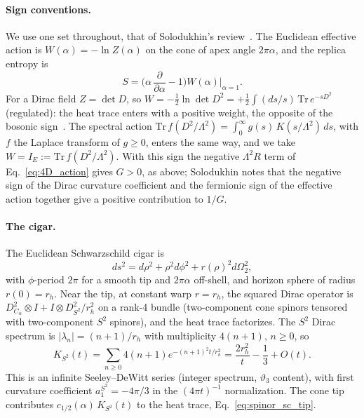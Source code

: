 \documentclass[11pt,a4paper]{article}
\theoremstyle{plain}
\theoremstyle{definition}
\renewcommand{\_}{\textunderscore\allowbreak}
\begin{document}
\paragraph{Sign conventions.} We use one set throughout, that of
Solodukhin's review~\cite{solodukhin2011_review}. The Euclidean effective
action is $W(\alpha) = -\ln Z(\alpha)$ on the cone of apex angle
$2\pi\alpha$, and the replica entropy is
\begin{equation}
  S = \Big(\alpha\,\frac{\partial}{\partial\alpha} - 1\Big)
      W(\alpha)\Big|_{\alpha = 1}.
  \label{eq:replica_formula}
\end{equation}
For a Dirac field $Z = \det D$, so
$W = -\tfrac12\ln\det D^2 = +\tfrac12\int (ds/s)\,\mathrm{Tr}\,e^{-sD^2}$
(regulated): the heat trace enters with a positive weight, the opposite of
the bosonic sign~\cite{kabat1995, solodukhin2011_review}. The spectral
action $\mathrm{Tr}\, f(D^2/\Lambda^2) = \int_0^\infty g(s)\,
K(s/\Lambda^2)\, ds$, with $f$ the Laplace transform of $g \ge 0$, enters
the same way, and we take $W = I_E := \mathrm{Tr}\, f(D^2/\Lambda^2)$.
With this sign the negative $\Lambda^2 R$ term of
Eq.~\eqref{eq:4D_action} gives $G > 0$, as above; Solodukhin notes that the
negative sign of the Dirac curvature coefficient and the fermionic sign of
the effective action together give a positive contribution to $1/G$.

\paragraph{The cigar.} The Euclidean Schwarzschild cigar is
\begin{equation}
  ds^2 = d\rho^2 + \rho^2 d\phi^2 + r(\rho)^2 d\Omega_2^2,
\end{equation}
with $\phi$-period $2\pi$ for a smooth tip and $2\pi\alpha$ off-shell, and
horizon sphere of radius $r(0) = r_h$. Near the tip, at constant warp
$r = r_h$, the squared Dirac operator is
$D_{C_\alpha}^2 \otimes I + I \otimes D_{S^2}^2/r_h^2$ on a rank-4 bundle
(two-component cone spinors tensored with two-component $S^2$ spinors), and
the heat trace factorizes. The $S^2$ Dirac spectrum is
$|\lambda_n| = (n+1)/r_h$ with multiplicity $4(n+1)$, $n \ge 0$, so
\begin{equation}
  K_{S^2}(t) = \sum_{n \geq 0} 4(n+1) e^{-(n+1)^2 t/r_h^2}
             = \frac{2 r_h^2}{t} - \frac13 + O(t).
  \label{eq:KS2}
\end{equation}
This is an infinite Seeley--DeWitt series (integer spectrum,
$\vartheta_3$ content), with first curvature coefficient
$a_1^{S^2} = -4\pi/3$ in the $(4\pi t)^{-1}$ normalization. The cone tip
contributes $c_{1/2}(\alpha)\,K_{S^2}(t)$ to the heat trace,
Eq.~\eqref{eq:spinor_sc_tip}.
\end{document}

